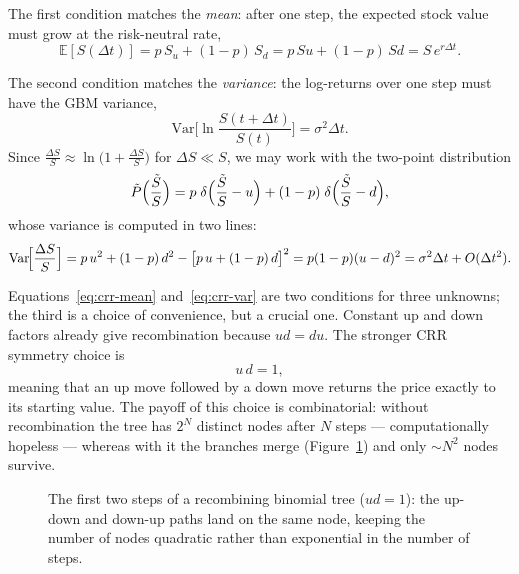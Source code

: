 The first condition matches the \emph{mean}: after one step, the expected stock value must grow at the risk-neutral rate,
\begin{equation}\label{eq:crr-mean}
\mathbb{E}[S(\Delta t)] = p\, S_u + (1-p)\, S_d = p\, Su + (1-p)\, Sd = S\, e^{r\Delta t}.
\end{equation}

The second condition matches the \emph{variance}: the log-returns over one step must have the GBM variance,
\begin{equation}
\mathrm{Var}\!\biggl[\ln\frac{S(t+\Delta t)}{S(t)}\biggr] = \sigma^2\Delta t.
\end{equation}
Since $\frac{\Delta S}{S}\approx \ln\bigl(1+\frac{\Delta S}{S}\bigr)$ for $\Delta S \ll S$, we may work with the two-point distribution
\begin{equation}
\tilde P\Bigl(\frac{\tilde S}{S}\Bigr) = p\;\delta\Bigl(\frac{\tilde S}{S}-u\Bigr) + (1-p)\;\delta\Bigl(\frac{\tilde S}{S}-d\Bigr),
\end{equation}
whose variance is computed in two lines:
\begin{equation}\label{eq:crr-var}
\mathrm{Var}\!\Bigl[\frac{\Delta S}{S}\Bigr] = p\, u^2 + (1-p)\, d^2 - \bigl[p\, u + (1-p)\, d\bigr]^2 = p(1-p)(u-d)^2 = \sigma^2\Delta t+O(\Delta t^2).
\end{equation}

Equations~\eqref{eq:crr-mean} and~\eqref{eq:crr-var} are two conditions for three unknowns; the third is a choice of convenience, but a crucial one.
Constant up and down factors already give recombination because $ud=du$.
The stronger CRR symmetry choice is
\begin{equation}
u\, d = 1,
\end{equation}
meaning that an up move followed by a down move returns the price exactly to its starting value.
The payoff of this choice is combinatorial: without recombination the tree has $2^N$ distinct nodes after $N$ steps --- computationally hopeless --- whereas with it the branches merge (Figure~\ref{fig:binomial-tree}) and only $\sim N^2$ nodes survive.

\begin{figure}[h!]
\centering
{}
\caption{The first two steps of a recombining binomial tree ($ud=1$): the up-down and down-up paths land on the same node, keeping the number of nodes quadratic rather than exponential in the number of steps.}
\label{fig:binomial-tree}
\end{figure}

